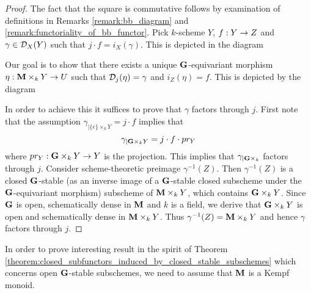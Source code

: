 \begin{proof}
The fact that the square is commutative follows by examination of definitions in Remarks \ref{remark:bb_diagram} and \ref{remark:functoriality_of_bb_functor}. Pick $k$-scheme $Y$, $f:Y\rightarrow Z$ and $\gamma \in {\mathcal D}_X(Y)$ such that $j\cdot f = i_X(\gamma)$. This is depicted in the diagram
\begin{center}
\end{center}
Our goal is to show that there exists a unique $\mathbf{G}$-equivariant morphism $\eta:\mathbf{M}\times_kY\rightarrow U$ such that ${\mathcal D}_j(\eta) = \gamma$ and $i_Z(\eta) = f$. This is depicted by the diagram
\begin{center}
\end{center}
In order to achieve this it suffices to prove that $\gamma$ factors through $j$. First note that the assumption $\gamma_{\mid \{e\}\times_kY} = j\cdot f$ implies that
$$\gamma_{\mid \mathbf{G}\times_kY} = j\cdot f\cdot pr_{Y}$$
where $pr_Y:\mathbf{G}\times_kY\rightarrow Y$ is the projection. This implies that $\gamma_{\mid \mathbf{G}\times_k}$ factors through $j$. Consider scheme-theoretic preimage $\gamma^{-1}(Z)$. Then $\gamma^{-1}(Z)$ is a closed $\mathbf{G}$-stable (as an inverse image of a $\mathbf{G}$-stable closed subscheme under the $\mathbf{G}$-equivariant morphism) subscheme of $\mathbf{M}\times_kY$, which contains $\mathbf{G} \times_k Y$. Since $\mathbf{G}$ is open, schematically dense in $\mathbf{M}$ and $k$ is a field, we derive that $\mathbf{G}\times_kY$ is open and schematically dense in $\mathbf{M}\times_kY$. Thus $\gamma^{-1}(Z) = \mathbf{M}\times_kY$ and hence $\gamma$ factors through $j$. 
\end{proof}
\noindent
In order to prove interesting result in the spirit of Theorem \ref{theorem:closed_subfunctors_induced_by_closed_stable_subschemes} which concerns open $\mathbf{G}$-stable subschemes, we need to assume that $\mathbf{M}$ is a Kempf monoid.

